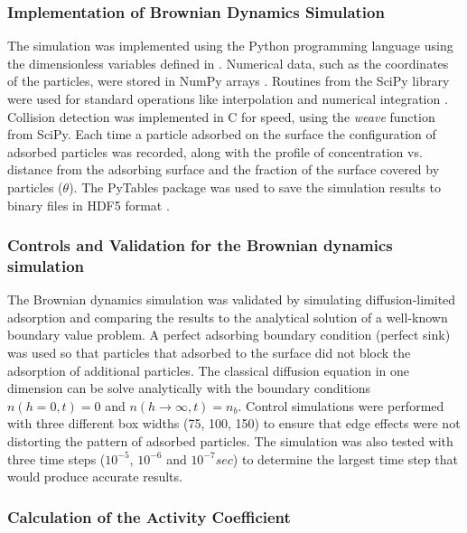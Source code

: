 \subsubsection{Implementation of Brownian Dynamics Simulation}

The simulation was implemented using the Python programming language
using the dimensionless variables defined in \cite{Magan2004}. Numerical
data, such as the coordinates of the particles, were stored in NumPy
arrays \cite{Oliphant2006}. Routines from the SciPy library were
used for standard operations like interpolation and numerical integration
\cite{Oliphant2007}. Collision detection was implemented in C for
speed, using the \emph{weave} function from SciPy. Each time a particle
adsorbed on the surface the configuration of adsorbed particles was
recorded, along with the profile of concentration vs. distance from
the adsorbing surface and the fraction of the surface covered by particles
($\theta$). The PyTables package was used to save the simulation
results to binary files in HDF5 format \cite{Alted2002-,HDFGroup2000-}. 


\subsubsection{Controls and Validation for the Brownian dynamics simulation}

The Brownian dynamics simulation was validated by simulating diffusion-limited
adsorption and comparing the results to the analytical solution of
a well-known boundary value problem. A perfect adsorbing boundary
condition (perfect sink) was used so that particles that adsorbed
to the surface did not block the adsorption of additional particles.
The classical diffusion equation in one dimension can be solve analytically
with the boundary conditions $n(h=0,t)=0$ and $n(h\rightarrow\infty,t)=n_{b}$.
Control simulations were performed with three different box widths
(75, 100, 150) to ensure that edge effects were not distorting the
pattern of adsorbed particles. The simulation was also tested with
three time steps ($10^{-5}$, $10^{-6}$ and $10^{-7}sec$) to determine
the largest time step that would produce accurate results.


\subsubsection{Calculation of the Activity Coefficient}

